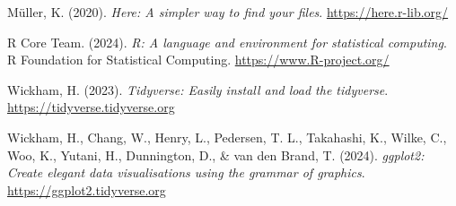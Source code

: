 \documentclass[
  12pt,
]{article}
\newlength{\cslhangindent}
\newenvironment{CSLReferences}[2] %
 {\begin{list}{}{%
  \setlength{\itemindent}{0pt}
  \setlength{\leftmargin}{0pt}
  \setlength{\parsep}{0pt}
  \ifodd #1
   \setlength{\leftmargin}{\cslhangindent}
   \setlength{\itemindent}{-1\cslhangindent}
  \fi
  \setlength{\itemsep}{#2\baselineskip}}}
 {\end{list}}
\begin{document}
\label{refs}
\begin{CSLReferences}{1}{0}
Müller, K. (2020). \emph{Here: A simpler way to find your files}.
\url{https://here.r-lib.org/}

R Core Team. (2024). \emph{R: A language and environment for statistical
computing}. R Foundation for Statistical Computing.
\url{https://www.R-project.org/}

Wickham, H. (2023). \emph{Tidyverse: Easily install and load the
tidyverse}. \url{https://tidyverse.tidyverse.org}

Wickham, H., Chang, W., Henry, L., Pedersen, T. L., Takahashi, K.,
Wilke, C., Woo, K., Yutani, H., Dunnington, D., \& van den Brand, T.
(2024). \emph{ggplot2: Create elegant data visualisations using the
grammar of graphics}. \url{https://ggplot2.tidyverse.org}

\end{CSLReferences}
\end{document}
